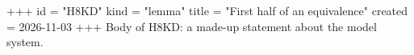 +++
id = "H8KD"
kind = "lemma"
title = "First half of an equivalence"
created = 2026-11-03
+++
Body of H8KD: a made-up statement about the model system.
